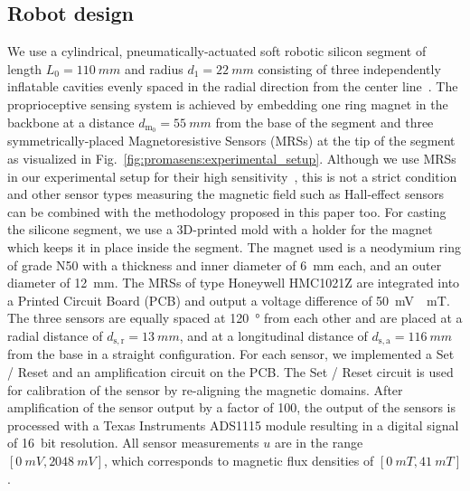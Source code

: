 \subsection{Robot design}\label{sub:promasens:robot_design}
We use a cylindrical, pneumatically-actuated soft robotic silicon segment of length $L_{0}=\SI{110}{mm}$ and radius $d_1 = \SI{22}{mm}$ consisting of three independently inflatable cavities evenly spaced in the radial direction from the center line~\cite{marchese2015recipe}. 
%
The proprioceptive sensing system is achieved by embedding one ring magnet in the backbone at a distance $d_{\mathrm{m}_0} = \SI{55}{mm}$ from the base of the segment and three symmetrically-placed Magnetoresistive Sensors (MRSs) at the tip of the segment as visualized in Fig.~\ref{fig:promasens:experimental_setup}. %
Although we use MRSs in our experimental setup for their high sensitivity~\cite{popovic2002bridging}, this is not a strict condition and other sensor types measuring the magnetic field such as Hall-effect sensors can be combined with the methodology proposed in this paper too.
For casting the silicone segment, we use a 3D-printed mold with a holder for the magnet which keeps it in place inside the segment.
The magnet used is a neodymium ring of grade N50 with a thickness and inner diameter of \SI{6}{mm} each, and an outer diameter of \SI{12}{mm}.
%
The MRSs of type Honeywell HMC1021Z are integrated into a Printed Circuit Board (PCB) and output a voltage difference of \SI{50}{mV \per mT}. %
The three sensors are equally spaced at \SI{120}{\degree} from each other and are placed at a radial distance of $d_{\mathrm{s},\mathrm{r}} = \SI{13}{mm}$, and at a longitudinal distance of $d_{\mathrm{s},\mathrm{a}} = \SI{116}{mm}$ from the base in a straight configuration.
For each sensor, we implemented a Set / Reset and an amplification circuit on the PCB.
The Set / Reset circuit is used for calibration of the sensor by re-aligning the magnetic domains. After amplification of the sensor output by a factor of 100, the output of the sensors is processed with a Texas Instruments ADS1115 module %
resulting in a digital signal of \SI{16}{bit} resolution. All sensor measurements $u$ are in the range $[\SI{0}{mV}, \SI{2048}{mV}]$, which corresponds to magnetic flux densities of  $[\SI{0}{mT}, \SI{41}{mT}]$.

